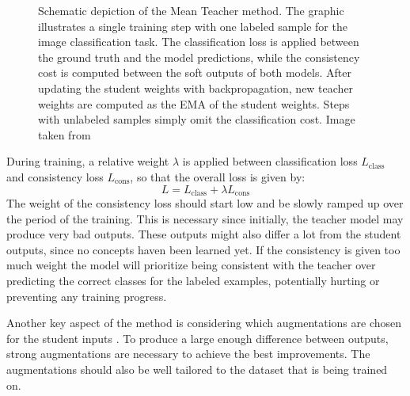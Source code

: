 \begin{figure}[htbp]
   \caption{Schematic depiction of the Mean Teacher method. The graphic illustrates a single training step with one labeled sample for the image classification task. The classification loss is applied between the ground truth and the model predictions, while the consistency cost is computed between the soft outputs of both models. After updating the student weights with backpropagation, new teacher weights are computed as the EMA of the student weights. Steps with unlabeled samples simply omit the classification cost. Image taken from \cite{tarvainenMeanTeachersAre2018}}
   \label{fig:mean_teacher}
\end{figure}

During training, a relative weight $\lambda$ is applied between classification loss $L_\text{class}$ and consistency loss $L_\text{cons}$, so that the overall loss is given by:
$$
    L = L_\text{class} + \lambda L_\text{cons}
$$
The weight of the consistency loss should start low and be slowly ramped up over the period of the training. 
This is necessary since initially, the teacher model may produce very bad outputs.
These outputs might also differ a lot from the student outputs, since no concepts haven been learned yet. 
If the consistency is given too much weight the model will prioritize being consistent with the teacher over predicting the correct classes for the labeled examples, potentially hurting or preventing any training progress. 

Another key aspect of the method is considering which augmentations are chosen for the student inputs \cite{tarvainenMeanTeachersAre2018}. To produce a large enough difference between outputs, strong augmentations are necessary to achieve the best improvements. The augmentations should also be well tailored to the dataset that is being trained on. 

